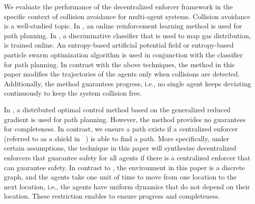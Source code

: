 We evaluate the performance of the decentralized enforcer framework in the specific context of collision avoidance for multi-agent systems.
Collision avoidance is a well-studied topic. In \cite{Zhu2020AdaptiveOD}, an online reinforcement learning method is used for path planning. 
In \cite{Zhu2019}, a discriminative classifier that is used to map gas distribution, is trained online. An entropy-based artificial potential field or entropy-based particle swarm optimization algorithm is used in conjunction with the classifier for path planning. In contrast with the above techniques, the method in this paper modifies the trajectories of the agents only when collisions are detected. Additionally, the method guarantees progress, i.e., no single agent keeps deviating continuously to keep the system collision free. 
 
In \cite{Rudd2017}, a distributed optimal control method based on the generalized reduced gradient is used for path planning. However, the method provides no guarantees for completeness. In contrast, we ensure a path exists if a centralized enforcer (referred to as a shield in ~\cite{BharNFM}) is able to find a path. More specifically, under certain assumptions, the technique in this paper will synthesize decentralized enforcers that guarantee safety for all agents if there is a centralized enforcer that can guarantee safety. %
In contrast to \cite{AlAbri2020ADO}, the environment in this paper is a discrete graph, and the agents take one unit of time to move from one location to the next location, i.e., the agents have uniform dynamics that do not depend on their location. These restriction enables to ensure progress and completeness.


